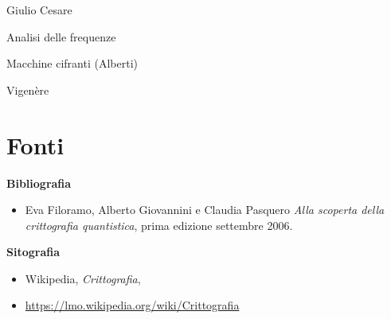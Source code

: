 \documentclass[a4paper, 12pt]{article}
\begin{document}
Giulio Cesare

Analisi delle frequenze

Macchine cifranti (Alberti)

Vigenère


\clearpage

\section{Fonti}

{\large \textbf{Bibliografia}\par}
\begin{itemize}
    \item Eva Filoramo, Alberto Giovannini e Claudia Pasquero \textit{Alla scoperta della crittografia quantistica}, prima edizione settembre 2006.
\end{itemize}

{\large \textbf{Sitografia}\par}
\begin{itemize}
    \item Wikipedia, \textit{Crittografia}, 
    \item[] \href{https://lmo.wikipedia.org/wiki/Crittografia}{https://lmo.wikipedia.org/wiki/Crittografia}
\end{itemize}
\end{document}
